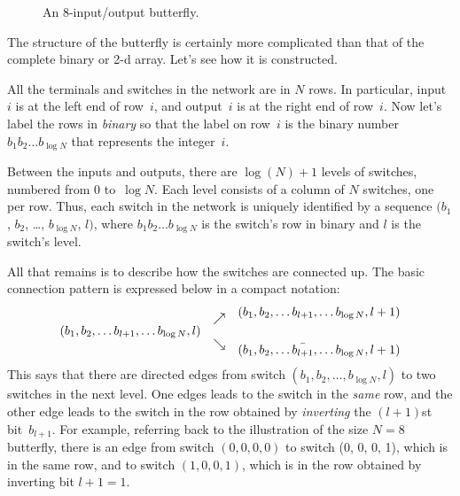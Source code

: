 \begin{figure}



\caption{An 8-input/output butterfly.}

\label{fig:6EN}

\end{figure}

The structure of the butterfly is certainly more complicated than that
of the complete binary or 2-d array.  Let's see how it is constructed.

All the terminals and switches in the network are in $N$ rows.  In
particular, input~$i$ is at the left end of row~$i$, and output~$i$ is
at the right end of row~$i$.  Now let's label the rows in
\emph{binary} so that the label on row~$i$ is the binary number
$b_1b_2\dots b_{\log N}$ that represents the integer~$i$.

Between the inputs and outputs, there are $\log(N) + 1$ levels of
switches, numbered from 0 to~$\log N$.  Each level consists of a
column of $N$ switches, one per row.  Thus, each switch in the network
is uniquely identified by a sequence $(b_1$, $b_2$, \dots, $b_{\log
  N}$, $l)$, where $b_1 b_2 \dots b_{\log N}$ is the switch's row in
binary and $l$ is the switch's level.

All that remains is to describe how the switches are connected up.
The basic connection pattern is expressed below in a compact notation:
\begin{equation*}
\begin{array}{lcr}
    &\raisebox{-5pt}{$\nearrow$}& (b_1, b_2, \dots b_{l + 1}, \dots b_{\log N}, l + 1) \\
(b_1, b_2, \dots b_{l + 1}, \dots b_{\log N}, l) &\\
    &\raisebox{5pt}{$\searrow$}& (b_1, b_2, \dots \bar{b_{l + 1}}, \dots b_{\log N}, l + 1) \\
\end{array}
\end{equation*}
This says that there are directed edges from switch $(b_1, b_2, \dots,
b_{\log N}, l)$ to two switches in the next level.  One edges leads to
the switch in the \emph{same} row, and the other edge leads to the
switch in the row obtained by \emph{inverting} the $(l + 1)$st
bit~$b_{l + 1}$.  For example, referring back to the illustration of
the size $N = 8$ butterfly, there is an edge from switch $(0, 0, 0,
0)$ to switch (0, 0, 0, 1), which is in the same row, and to switch
$(1, 0, 0, 1)$, which is in the row obtained by inverting bit $l + 1 =
1$.

